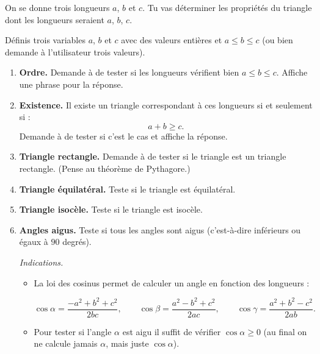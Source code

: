 \documentclass[11pt,class=report,crop=false]{standalone}
\begin{document}
\begin{activite}[Triangles]


On se donne trois longueurs $a$, $b$ et $c$. Tu vas déterminer les propriétés du triangle dont les longueurs seraient $a$, $b$, $c$.



Définis trois variables $a$, $b$ et $c$ avec des valeurs entières et $a \le b \le c$
(ou bien demande à l'utilisateur trois valeurs).

\begin{enumerate}
  \item \textbf{Ordre.} Demande à \Python{} de tester si les longueurs vérifient bien $a \le b \le c$. Affiche une phrase pour la réponse.
  
  \item \textbf{Existence.} Il existe un triangle correspondant à ces longueurs si et seulement si :
  $$a + b \ge c.$$
  Demande à \Python{} de tester si c'est le cas et affiche la réponse.
  
  
  \item  \textbf{Triangle rectangle.} Demande à \Python{} de tester si le triangle est un triangle rectangle. (Pense au théorème de Pythagore.)
  
   \item  \textbf{Triangle équilatéral.} Teste si le triangle est équilatéral. 
   
   \item  \textbf{Triangle isocèle.} Teste si le triangle est isocèle.   
   
   \item  \textbf{Angles aigus.} Teste si tous les angles sont aigus (c'est-à-dire inférieurs ou égaux à $90$ degrés).
   
    \emph{Indications.} 
    \begin{itemize}
      \item La loi des cosinus permet de calculer un angle en fonction des longueurs :
      
   
   $$\cos \alpha = \frac{-a^2+b^2+c^2}{2bc},
   \qquad
   \cos \beta = \frac{a^2-b^2+c^2}{2ac},
   \qquad
   \cos \gamma = \frac{a^2+b^2-c^2}{2ab}.$$   

   \smallskip
   
    \item Pour tester si l'angle $\alpha$ est aigu il suffit de vérifier $\cos \alpha \ge 0$ (au final on ne calcule jamais $\alpha$, mais juste $\cos \alpha$).
   
   \end{itemize} 
   
\end{enumerate}   
     
    
\end{activite}
\end{document}
